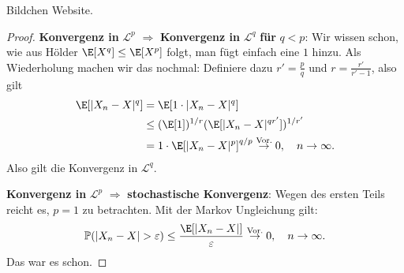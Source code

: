 \begin{satz}
	Bildchen Website. %
\end{satz}




\begin{proof}
	\textbf{Konvergenz in } $\mathcal L^p$ $\Rightarrow$ \textbf{ Konvergenz in } $\mathcal L^q$ \textbf{ f\"ur } $q<p$:  Wir wissen schon, wie aus H\"older $\E[X^q]\leq \E[X^p]$ folgt, man f\"ugt einfach eine $1$ hinzu. Als Wiederholung machen wir das nochmal: Definiere dazu $r' = \frac{p}{q}$ und $r=\frac{r'}{r'-1}$, also gilt
	\begin{align*}
		\E[|X_n - X|^q]& = \E[1 \cdot |X_n - X|^q]\\
		& \leq (\E[1])^{1/r}(\E[|X_n - X|^{qr'}])^{1/{r'}}\\
		& = 1 \cdot \E[|X_n - X|^p]^{q/p} \overset{\text{Vor.}}{\to} 0, \quad n\to\infty.
	\end{align*}
	Also gilt die Konvergenz in $\mathcal L^q$.\smallskip
	
\textbf{Konvergenz in } $\mathcal L^p$  $\Rightarrow$ \textbf{ stochastische Konvergenz}: Wegen des ersten Teils reicht es, $p=1$ zu betrachten. Mit der Markov Ungleichung gilt:
\begin{align*}
	\mathbb{P}(|X_n - X| > \varepsilon) \leq \frac{\E[|X_n - X|]}{\varepsilon} \overset{\text{Vor.}}{\rightarrow }0,\quad n \to \infty.
\end{align*}
Das war es schon.\smallskip


\end{proof}
